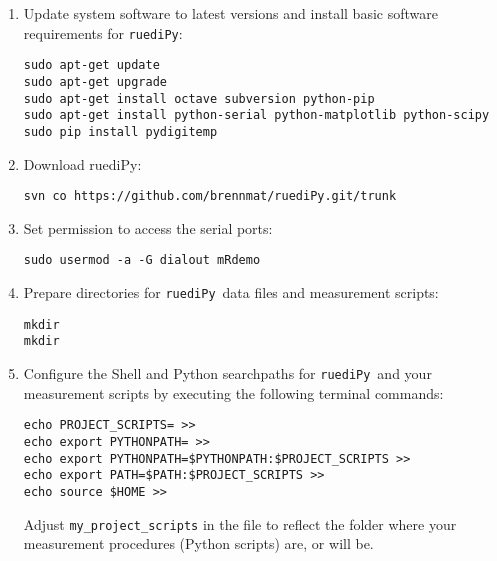 \documentclass[12pt]{article}   	%
\newcommand{\ruediPy}{\texttt{ruediPy}}
\begin{document}
\begin{enumerate}

\item Update system software to latest versions and install basic software requirements for \ruediPy:\par
\texttt{sudo apt-get update}\\
\texttt{sudo apt-get upgrade}\\
\texttt{sudo apt-get install octave subversion python-pip}\\
\texttt{sudo apt-get install python-serial python-matplotlib python-scipy}\\
\texttt{sudo pip install pydigitemp}\\

\item Download ruediPy:\par
\texttt{svn co https://github.com/brennmat/ruediPy.git/trunk }


\item Set permission to access the serial ports:\par
\texttt{sudo usermod -a -G dialout mRdemo}

\item Prepare directories for \ruediPy\ data files and measurement scripts:\par
\texttt{mkdir }\\
\texttt{mkdir }

\item Configure the Shell and Python searchpaths for \ruediPy\ and your measurement scripts by executing the following terminal commands:\par
{\scriptsize
\mbox{\texttt{echo PROJECT_SCRIPTS= >> }}\\
\mbox{\texttt{echo export PYTHONPATH= >> }}\\
\mbox{\texttt{echo export PYTHONPATH=\textsc{}\$PYTHONPATH\textsc{}:\textsc{}\$PROJECT_SCRIPTS\textsc{} >> }}\\
\mbox{\texttt{echo export PATH=\textsc{}\$PATH\textsc{}:\textsc{}\$PROJECT_SCRIPTS\textsc{} >> }}\\
\mbox{\texttt{echo source \textsc{}\$HOME\textsc{} >> }}
}

Adjust \texttt{my_project_scripts} in the  file to reflect the folder where your measurement procedures (Python scripts) are, or will be.

\end{enumerate}
\end{document}

